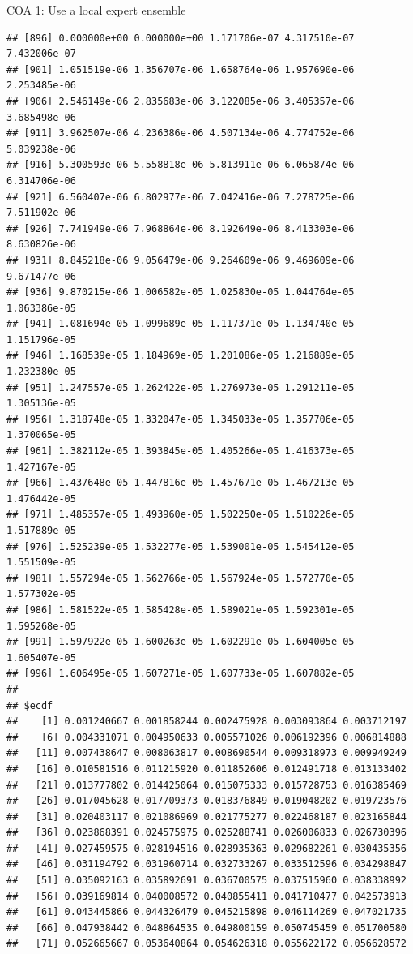 \documentclass[ignorenonframetext,]{beamer}
\begin{document}
\begin{frame}[fragile]{COA 1: Use a local expert ensemble}
\begin{verbatim}
## [896] 0.000000e+00 0.000000e+00 1.171706e-07 4.317510e-07 7.432006e-07
## [901] 1.051519e-06 1.356707e-06 1.658764e-06 1.957690e-06 2.253485e-06
## [906] 2.546149e-06 2.835683e-06 3.122085e-06 3.405357e-06 3.685498e-06
## [911] 3.962507e-06 4.236386e-06 4.507134e-06 4.774752e-06 5.039238e-06
## [916] 5.300593e-06 5.558818e-06 5.813911e-06 6.065874e-06 6.314706e-06
## [921] 6.560407e-06 6.802977e-06 7.042416e-06 7.278725e-06 7.511902e-06
## [926] 7.741949e-06 7.968864e-06 8.192649e-06 8.413303e-06 8.630826e-06
## [931] 8.845218e-06 9.056479e-06 9.264609e-06 9.469609e-06 9.671477e-06
## [936] 9.870215e-06 1.006582e-05 1.025830e-05 1.044764e-05 1.063386e-05
## [941] 1.081694e-05 1.099689e-05 1.117371e-05 1.134740e-05 1.151796e-05
## [946] 1.168539e-05 1.184969e-05 1.201086e-05 1.216889e-05 1.232380e-05
## [951] 1.247557e-05 1.262422e-05 1.276973e-05 1.291211e-05 1.305136e-05
## [956] 1.318748e-05 1.332047e-05 1.345033e-05 1.357706e-05 1.370065e-05
## [961] 1.382112e-05 1.393845e-05 1.405266e-05 1.416373e-05 1.427167e-05
## [966] 1.437648e-05 1.447816e-05 1.457671e-05 1.467213e-05 1.476442e-05
## [971] 1.485357e-05 1.493960e-05 1.502250e-05 1.510226e-05 1.517889e-05
## [976] 1.525239e-05 1.532277e-05 1.539001e-05 1.545412e-05 1.551509e-05
## [981] 1.557294e-05 1.562766e-05 1.567924e-05 1.572770e-05 1.577302e-05
## [986] 1.581522e-05 1.585428e-05 1.589021e-05 1.592301e-05 1.595268e-05
## [991] 1.597922e-05 1.600263e-05 1.602291e-05 1.604005e-05 1.605407e-05
## [996] 1.606495e-05 1.607271e-05 1.607733e-05 1.607882e-05
## 
## $ecdf
##    [1] 0.001240667 0.001858244 0.002475928 0.003093864 0.003712197
##    [6] 0.004331071 0.004950633 0.005571026 0.006192396 0.006814888
##   [11] 0.007438647 0.008063817 0.008690544 0.009318973 0.009949249
##   [16] 0.010581516 0.011215920 0.011852606 0.012491718 0.013133402
##   [21] 0.013777802 0.014425064 0.015075333 0.015728753 0.016385469
##   [26] 0.017045628 0.017709373 0.018376849 0.019048202 0.019723576
##   [31] 0.020403117 0.021086969 0.021775277 0.022468187 0.023165844
##   [36] 0.023868391 0.024575975 0.025288741 0.026006833 0.026730396
##   [41] 0.027459575 0.028194516 0.028935363 0.029682261 0.030435356
##   [46] 0.031194792 0.031960714 0.032733267 0.033512596 0.034298847
##   [51] 0.035092163 0.035892691 0.036700575 0.037515960 0.038338992
##   [56] 0.039169814 0.040008572 0.040855411 0.041710477 0.042573913
##   [61] 0.043445866 0.044326479 0.045215898 0.046114269 0.047021735
##   [66] 0.047938442 0.048864535 0.049800159 0.050745459 0.051700580
##   [71] 0.052665667 0.053640864 0.054626318 0.055622172 0.056628572

\end{verbatim}
\end{frame}
\end{document}
